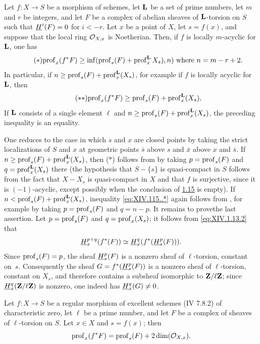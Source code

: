 \begin{corollaire} \label{XIV.1.15}
Let $f:X\to S$ be a morphism of schemes, let $\mathbf L$ be a set of prime numbers, let $m$ and $r$ be integers, and let $F$ be a complex of abelian sheaves of $\mathbf L$-torsion on $S$ such that $\mathop{\underline{H}}\nolimits^i(F)=0$ for $i<-r$. Let $x$ be a point of $X$, let $s=f(x)$, and suppose that the local ring $\mathcal O_{X,x}$ is Noetherian. Then, if $f$ is locally $m$-acyclic for $\mathbf L$, one has
\begin{equation*} \label{eq:XIV.115..*} \tag{$*$} {\operatorname{prof}_x(f^*F)\geq\inf(\operatorname{prof}_s(F)+\operatorname{prof}^\mathbf L_xX_s), n)\text{ where }n=m-r+2.}
\end{equation*}
In particular, if $n\geq\operatorname{prof}_s(F)+\operatorname{prof}_x^\mathbf L(X_s)$, for example if $f$ is locally acyclic for $\mathbf L$, then
\begin{equation*} \label{eq:XIV.15.**} \tag{$**$} {\operatorname{prof}_x(f^*F)\geq\operatorname{prof}_s(F)+\operatorname{prof}_x^\mathbf L(X_s).}
\end{equation*}
If $\mathbf L$ consists of a single element $\ell$ and $n\geq \operatorname{prof}_s(F)+\operatorname{prof}_x^\mathbf L(X_s)$, the preceding inequality is an equality.
\end{corollaire}

One reduces to the case in which $s$ and $x$ are closed points by taking the strict localizations of $S$ and $x$ at geometric points $\bar s$ above $s$ and $\bar x$ above $x$ and $\bar s$. If $n\geq\operatorname{prof}_s(F)+\operatorname{prof}_x^\mathbf L(X_s)$, then ($*$) follows from  by taking $p=\operatorname{prof}_s(F)$ and $q=\operatorname{prof}_x^\mathbf L(X_s)$ there (the hypothesis that $S-\{s\}$ is quasi-compact in $S$ follows from the fact that $X-X_s$ is quasi-compact in $X$ and that $f$ is surjective, since it is $(-1)$-acyclic, except possibly when the conclusion of \hyperref[XIV.1.15]{1.15} is empty). If $n<\operatorname{prof}_s(F)+\operatorname{prof}_x^\mathbf L(X_s)$, inequality \eqref{eq:XIV.115..*} again follows from , for example by taking $p=\operatorname{prof}_s(F)$ and $q=n-p$. It remains to prove\pageoriginale the last assertion. Let $p=\operatorname{prof}_s(F)$ and $q=\operatorname{prof}_x(X_s)$; it follows from \eqref{eq:XIV.1.13.2} that
$$
\mathop{\underline{H}}\nolimits_x^{p+q}(f^*(F))\simeq \mathop{\underline{H}}\nolimits_x^q(f^*(\mathop{\underline{H}}\nolimits^p_s(F))).
$$
Since $\operatorname{prof}_s(F)=p$, the sheaf $\mathop{\underline{H}}\nolimits^p_s(F)$ is a nonzero sheaf of $\ell$-torsion, constant on~$s$. Consequently the sheaf $G=f^*(\mathop{\underline{H}}\nolimits_s^p(F))$ is a nonzero sheaf of $\ell$-torsion, constant on $X_s$, and therefore contains a subsheaf isomorphic to $\mathbf Z/\ell\mathbf Z$; since $\mathop{\underline{H}}\nolimits_x^q(\mathbf Z/\ell\mathbf Z)$ is nonzero, one indeed has $\mathop{\underline{H}}\nolimits_x^q(G)\neq 0$.

\begin{corollaire} \label{XIV.1.16}
Let $f:X\to S$ be a regular morphism of excellent schemes (\textup{\EGA IV 7.8.2}) of characteristic zero, let $\ell$ be a prime number, and let $F$ be a complex of sheaves of $\ell$-torsion on $S$. Let $x\in X$ and $s=f(x)$; then
$$
\operatorname{prof}_x(f^*F)=\operatorname{prof}_s(F)+2\dim(\mathcal O_{X,x}).
$$
\end{corollaire}

